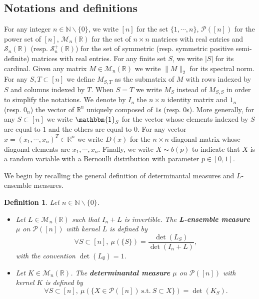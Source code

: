\documentclass{article}
\numberwithin{equation}{section}
\newcommand{\bN}{\mathbb{N}}
\newcommand{\bR}{\mathbb{R}}
\newcommand{\cara}[1]{\mathbbm{1}_{#1}}
\theoremstyle{plain}
\newtheorem{definition}[proposition]{Definition}
\begin{document}
\subsection{Notations and definitions}

For any integer $n\in\bN\backslash\{0\}$, we write $[n]$ for the set $\{1,\cdots, n\}$, $\mathcal{P}([n])$ for the power set of $[n]$, $\mathcal{M}_n(\bR)$ for the set of $n\times n$ matrices with real entries and $\mathcal{S}_n(\bR)$ (resp. $\mathcal{S}^+_n(\bR)$) for the set of symmetric (resp. symmetric positive semi-definite) matrices with real entries. For any finite set $S$, we write $|S|$ for its cardinal. Given any matrix $M\in\mathcal{M}_n(\bR)$ we write $\|M\|_2$ for its spectral norm. For any $S,T\subset[n]$ we define $M_{S,T}$ as the submatrix of $M$ with rows indexed by $S$ and columns indexed by $T$. When $S=T$ we write $M_S$ instead of $M_{S, S}$ in order to simplify the notations. We denote by $I_n$ the $n\times n$ identity matrix and $1_n$ (resp. $0_n$) the vector of $\bR^n$ uniquely composed of $1$s (resp. $0$s). More generally, for any $S\subset [n]$ we write $\cara{S}$ for the vector whose elements indexed by $S$ are equal to $1$ and the others are equal to $0$. For any vector $x=(x_1,\cdots, x_n)^T\in\bR^n$ we write $D(x)$ for the $n\times n$ diagonal matrix whose diagonal elements are $x_1,\cdots, x_n$. Finally, we write $X\sim b(p)$ to indicate that $X$ is a random variable with a Bernoulli distribution with parameter $p\in [0, 1]$.

\medskip

\noindent We begin by recalling the general definition of determinantal measures and $L$-ensemble measures.

\begin{definition}
Let $n\in\bN\backslash\{0\}$. 
\begin{itemize}
\item Let $L\in\mathcal{M}_n(\bR)$ such that $I_n+L$ is invertible. The \textbf{L-ensemble measure} $\mu$ on $\mathcal{P}([n])$ with kernel $L$ is defined by
\[\forall S\subset [n],~\mu(\{S\})=\frac{\det(L_S)}{\det(I_{n}+L)},\]
with the convention $\det(L_\emptyset)=1$.
\item Let $K\in\mathcal{M}_n(\bR)$. The \textbf{determinantal measure} $\mu$ on $\mathcal{P}([n])$ with kernel $K$ is defined by
\[\forall S\subset [n],~\mu(\{X\in\mathcal{P}([n])~\mbox{s.t.}~S\subset X\})=\det(K_S).\]
\end{itemize}
\end{definition}
\end{document}
